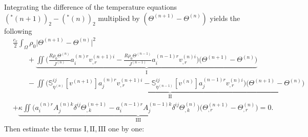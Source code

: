 \documentclass[12pt,a4paper]{amsart}
\numberwithin{equation}{section}
\theoremstyle{plain}
\theoremstyle{definition}
\begin{document}
Integrating the difference of the temperature equations $(^*(n+1))_2-(^*(n))_2$ multiplied by $(\Theta^{(n+1)}-\Theta^{(n)})$ yields the following
\begin{align*}
& \frac{c_v}{2}\int_{\Omega}\rho_0\Big| \Theta^{(n+1)}-\Theta^{(n)} \Big|^2 \\
&\qquad+\underbrace{\iint   \Big(\frac{R\rho_0\Theta^{(n)}}{J^{(n)}}a^{(n)r}_iv^{(n+1)i}_{,r}-\frac{R\rho_0\Theta^{(n-1)}}{J^{(n-1)}}a^{(n-1)r}_iv^{(n)i}_{,r}\Big) \Big( \Theta^{(n+1)}-\Theta^{(n)}\Big)}_{\mathrm{I}}\\
&\qquad-\underbrace{\iint  \Big(\mathbb{S}^{ij}_{\eta^{(n)}}[v^{(n+1)}]a^{(n)r}_jv^{(n+1)i}_{,r}-\mathbb{S}^{ij}_{\eta^{(n-1)}}[v^{(n)}]a^{(n-1)r}_jv^{(n)i}_{,r}\Big)\Big( \Theta^{(n+1)}-\Theta^{(n)}\Big)}_{\mathrm{II}}\\
&+\underbrace{\kappa\iint \Big(a^{(n)r}_iA^{(n)k}_j \delta^{ij} \Theta^{(n+1)}_{,k}-a^{(n-1)r}_iA^{(n-1)k}_j \delta^{ij} \Theta^{(n)}_{,k}\Big)\Big( \Theta^{(n+1)}_{,r}-\Theta^{(n)}_{,r}\Big)}_{\mathrm{III}}=0.
\end{align*}
Then estimate the terms $\mathrm{I},\mathrm{II},\mathrm{III}$ one by one:
\end{document}
